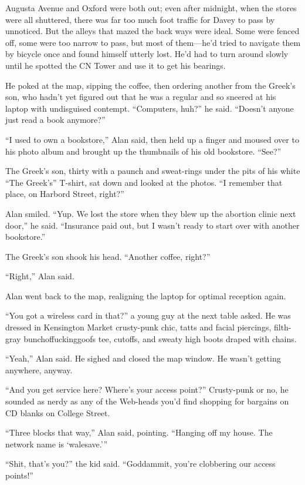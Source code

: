 \documentclass{article}
\begin{document}
Augusta Avenue and Oxford were both out; even after midnight, when the
stores were all shuttered, there was far too much foot traffic for
Davey to pass by unnoticed.  But the alleys that mazed the back ways
were ideal.  Some were fenced off, some were too narrow to pass, but
most of them---he'd tried to navigate them by bicycle once and found
himself utterly lost.  He'd had to turn around slowly until he spotted
the CN Tower and use it to get his bearings.

He poked at the map, sipping the coffee, then ordering another from
the Greek's son, who hadn't yet figured out that he was a regular and
so sneered at his laptop with undisguised contempt.  ``Computers,
huh?'' he said.  ``Doesn't anyone just read a book anymore?''

``I used to own a bookstore,'' Alan said, then held up a finger and
moused over to his photo album and brought up the thumbnails of his
old bookstore.  ``See?''

The Greek's son, thirty with a paunch and sweat-rings under the pits
of his white ``The Greek's'' T-shirt, sat down and looked at the
photos.  ``I remember that place, on Harbord Street, right?''

Alan smiled.  ``Yup.  We lost the store when they blew up the abortion
clinic next door,'' he said.  ``Insurance paid out, but I wasn't ready
to start over with another bookstore.''

The Greek's son shook his head.  ``Another coffee, right?''

``Right,'' Alan said.

Alan went back to the map, realigning the laptop for optimal reception
again.

``You got a wireless card in that?'' a young guy at the next table
asked.  He was dressed in Kensington Market crusty-punk chic, tatts
and facial piercings, filth-gray bunchoffuckinggoofs tee, cutoffs, and
sweaty high boots draped with chains.

``Yeah,'' Alan said.  He sighed and closed the map window.  He wasn't
getting anywhere, anyway.

``And you get service here?  Where's your access point?'' Crusty-punk
or no, he sounded as nerdy as any of the Web-heads you'd find shopping
for bargains on CD blanks on College Street.

``Three blocks that way,'' Alan said, pointing.  ``Hanging off my
house.  The network name is `walesave.'''

``Shit, that's you?'' the kid said.  ``Goddammit, you're clobbering
our access points!''
\end{document}
